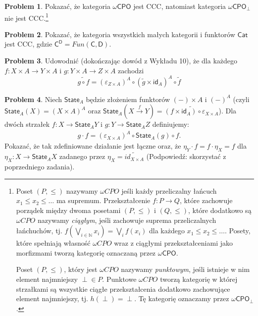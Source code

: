 \documentclass[9pt]{amsart}
\theoremstyle{plain}
\theoremstyle{definition}
\newtheorem{problem}{Problem}
\numberwithin{equation}{section}
\begin{document}
\begin{problem}
Pokazać, że kategoria $\omega \mathsf{CPO}$ jest CCC, natomiast kategoria $\omega \mathsf{CPO}_\perp$ nie jest CCC.\footnote{Poset $(P,\leq)$ nazywamy $\omega CPO$ jeśli każdy przeliczalny łańcuch $x_1\leq x_2 \leq \dots$ ma supremum. Przekształcenie $f:P\to Q$, które zachowuje porządek między dwoma posetami $(P,\leq)$ i $(Q,\leq)$, które dodatkowo są $\omega CPO$ nazywamy \emph{ciągłym}, jeśli zachowuje suprema przeliczalnych łańchuchów, tj. $f(\bigvee_{i\in \mathbb{N}} x_i ) = \bigvee_{i} f(x_i)$ dla każdego $x_1\leq x_2\leq \ldots$. Posety, które spełniają własność $\omega CPO$ wraz z ciągłymi przekształceniami jako morfizmami tworzą kategorię oznaczaną przez $\omega\mathsf{CPO}$. 

Poset $(P,\leq)$, który jest $\omega CPO$ nazywamy \emph{punktowym}, jeśli istnieje w nim element najmniejszy $\perp\in P$. Punktowe $\omega CPO$ tworzą kategorię w której strzałkami są wszystkie ciągłe przekształcenia dodatkowo zachowujące element najmniejszy, tj. $h(\perp)= \perp$. Tę kategorię oznaczamy przez $\omega \mathsf{CPO}_\perp$.}  
\end{problem}


\begin{problem}
Pokazać, że kategoria wszystkich małych kategorii i funktorów $\mathsf{Cat}$ jest CCC, gdzie $\mathsf{C}^\mathsf{D} = Fun(\mathsf{C},\mathsf{D})$. 
\end{problem}

\begin{problem}
Udowodnić (dokończając dowód z Wykładu 10), że dla każdego $f:X\times A\to Y\times A$ i $g:Y\times A\to Z\times A$
zachodzi
$$
\widetilde{g\circ f} = (\varepsilon_{Z\times A})^A\circ (\widetilde{g}\times \mathsf{id}_A)^A\circ \widetilde{f}
$$
\end{problem}

\begin{problem}
Niech $\mathsf{State}_A$ będzie złożeniem funktorów 
$(-)\times A$ i $(-)^A$ (czyli $\mathsf{State}_A(X) = (X\times A)^A$ oraz
$\mathsf{State}_A(X\stackrel{f}{\to} Y) = \widetilde{ (f\times \mathsf{id}_A) \circ \varepsilon_{X\times A} }$). Dla dwóch strzałek $f:X\to \mathsf{State}_A Y$ i $g:Y\to \mathsf{State}_A Z$ definiujemy:
\begin{align*}
  g\cdot f = (\varepsilon_{X\times A})^A \circ \mathsf{State}_A (g) \circ f.
\end{align*}
Pokazać, że tak zdefiniowane działanie jest łączne oraz, że 
$\eta_Y \cdot f = f\cdot \eta_X = f$ dla $\eta_X:X\to \mathsf{State}_A X$ 
zadanego przez $\eta_X = \widetilde{id_{X\times A}}$ (Podpowiedź: skorzystać z poprzedniego zadania).
\end{problem}
\end{document}
